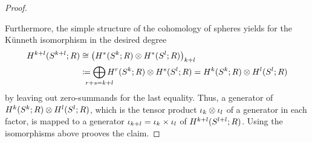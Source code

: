 \begin{Cor}
\begin{proof}
\begin{center}
    \end{center}
    Furthermore, the simple structure of the cohomology of spheres
    yields for the Künneth isomorphism in the desired degree
    \begin{align*}
      \H^{\rkk+\rkl}(\Sphere{\rkk+\rkl};R)
      &\cong
        \left(\H^*(\Sphere{\rkk}; R)\otimes \H^*(\Sphere{\rkl}; R)\right)_{\rkk+\rkl}\\
      &\coloneqq
        \bigoplus_{\mathclap{r+s=\rkk+\rkl}}
        \H^r(\Sphere{\rkk};R)\otimes \H^s(\Sphere{\rkl};R)
        =
        \H^{\rkk}(\Sphere{\rkk};R)\otimes \H^{\rkl}(\Sphere{\rkl};R)
    \end{align*}
    by leaving out zero-summands for the last equality.
    Thus, a generator of
    $H^{k}(S^{k}; R)\otimes H^{l}(S^{l}; R)$,
    which is the tensor product $\iota_{k}\otimes\iota_{l}$ of a generator
    in each factor,
    is mapped to a generator $\iota_{k+l}=\iota_{k}\times\iota_{l}$ of
    $H^{k+l}(S^{l+l}; R)$.
    Using the isomorphisms above prooves the claim.
  \end{proof}
\end{Cor}

